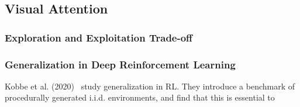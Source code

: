 


\subsection{Visual Attention}


\subsubsection{Exploration and Exploitation Trade-off}




\subsubsection{Generalization in Deep Reinforcement Learning}




Kobbe et al. (2020)~\cite{} study generalization in RL. They introduce a benchmark of procedurally generated i.i.d. environments, and find that this is essential to 

